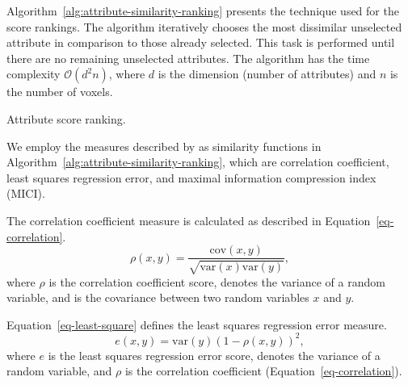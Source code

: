 Algorithm~\ref{alg:attribute-similarity-ranking} presents the technique used for the score rankings. The algorithm iteratively chooses the most dissimilar unselected attribute in comparison to those already selected. This task is performed until there are no remaining unselected attributes. The algorithm has the time complexity $\mathcal{O} (d^2n)$, where $d$ is the dimension (number of attributes) and $n$ is the number of voxels.

\begin{algorithm}
    \caption{Attribute score ranking.}
    \label{alg:attribute-similarity-ranking}
\end{algorithm}

We employ the measures described by \cite{mitra2002} as similarity functions in Algorithm~\ref{alg:attribute-similarity-ranking}, which are correlation coefficient, least squares regression error, and maximal information compression index (MICI).

The correlation coefficient measure is calculated as described in Equation~\ref{eq-correlation}.
\begin{equation}
    \rho(x, y) = \frac{\text{cov}(x, y)}{\sqrt{\text{var}(x)\text{var}(y)}},
    \label{eq-correlation}
\end{equation}
where $\rho$ is the correlation coefficient score,  denotes the variance of a random variable, and  is the covariance between two random variables $x$ and $y$.

Equation~\ref{eq-least-square} defines the least squares regression error measure.
\begin{equation}
    e(x, y) = \text{var}(y)(1-\rho(x,y))^2,
    \label{eq-least-square}
\end{equation}
where $e$ is the least squares regression error score,  denotes the variance of a random variable, and $\rho$ is the correlation coefficient (Equation~\ref{eq-correlation}).

